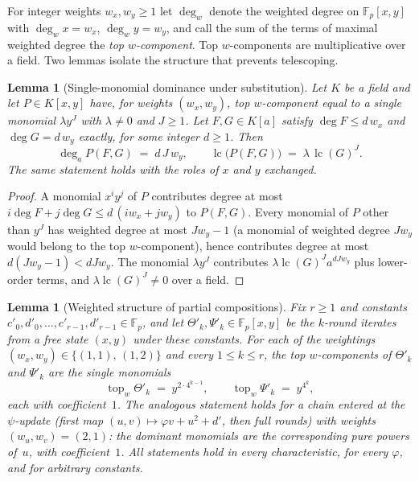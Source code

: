 \documentclass[11pt,a4paper]{article}
\newtheorem{lemma}[theorem]{Lemma}
\theoremstyle{definition}
\newcommand{\Fp}{\mathbb{F}_p}
\begin{document}
For integer weights $w_x, w_y \ge 1$ let $\deg_w$ denote the weighted
degree on $\Fp[x, y]$ with $\deg_w x = w_x$, $\deg_w y = w_y$, and call
the sum of the terms of maximal weighted degree the \emph{top
$w$-component}. Top $w$-components are multiplicative over a field. Two
lemmas isolate the structure that prevents telescoping.

\begin{lemma}[Single-monomial dominance under substitution]\label{lem:dominance}
Let $K$ be a field and let $P \in K[x, y]$ have, for weights
$(w_x, w_y)$, top $w$-component equal to a single monomial
$\lambda y^{J}$ with $\lambda \ne 0$ and $J \ge 1$. Let $F, G \in K[a]$
satisfy $\deg F \le d\,w_x$ and $\deg G = d\,w_y$ exactly, for some
integer $d \ge 1$. Then
\[
  \deg_a P(F, G) \;=\; d\,J\,w_y,
  \qquad
  \operatorname{lc}\bigl(P(F, G)\bigr)
   \;=\; \lambda\,\operatorname{lc}(G)^{J}.
\]
The same statement holds with the roles of $x$ and $y$ exchanged.
\end{lemma}

\begin{proof}
A monomial $x^i y^j$ of $P$ contributes degree at most
$i \deg F + j \deg G \le d\,(i w_x + j w_y)$ to $P(F, G)$. Every
monomial of $P$ other than $y^{J}$ has weighted degree at most
$J w_y - 1$ (a monomial of weighted degree $J w_y$ would belong to the
top $w$-component), hence contributes degree at most
$d(J w_y - 1) < d J w_y$. The monomial $\lambda y^{J}$ contributes
$\lambda \operatorname{lc}(G)^{J} a^{d J w_y}$ plus lower-order terms,
and $\lambda \operatorname{lc}(G)^{J} \ne 0$ over a field.
\end{proof}

\begin{lemma}[Weighted structure of partial compositions]\label{lem:partial_weights}
Fix $r \ge 1$ and constants
$c'_0, d'_0, \ldots, c'_{r-1}, d'_{r-1} \in \Fp$, and let
$\Theta'_k, \Psi'_k \in \Fp[x, y]$ be the $k$-round iterates from a
free state $(x, y)$ under these constants. For each of the weightings
$(w_x, w_y) \in \{(1, 1),\, (1, 2)\}$ and every $1 \le k \le r$, the
top $w$-components of $\Theta'_k$ and $\Psi'_k$ are the single
monomials
\[
  \operatorname{top}_w \Theta'_k \;=\; y^{2 \cdot 4^{k-1}},
  \qquad
  \operatorname{top}_w \Psi'_k \;=\; y^{4^{k}},
\]
each with coefficient~$1$. The analogous statement holds for a chain
entered at the $\psi$-update (first map
$(u, v) \mapsto \varphi v + u^2 + d'$, then full rounds) with weights
$(w_u, w_v) = (2, 1)$: the dominant monomials are the corresponding
pure powers of~$u$, with coefficient~$1$. All statements hold in every
characteristic, for every $\varphi$, and for arbitrary constants.
\end{lemma}
\end{document}
